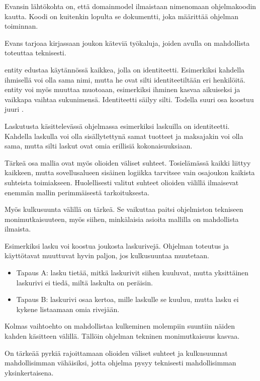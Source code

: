 Evansin lähtökohta on, että \gls{domainmodel} ilmaistaan nimenomaan
ohjelmakoodin kautta. Koodi on kuitenkin lopulta se dokumentti, joka
määrittää ohjelman toiminnan.

Evans tarjoaa kirjassaan joukon käteviä työkaluja, joiden avulla
 on mahdollista toteuttaa teknisesti.

\Gls{entity} edustaa käytännössä kaikkea, jolla on identiteetti.
Esimerkiksi kahdella ihmisellä voi olla sama nimi, mutta he ovat silti
identiteetiltään eri henkilöitä. \gls{entity} voi myös muuttaa muotoaan,
esimerkiksi ihminen kasvaa aikuiseksi ja vaikkapa vaihtaa sukunimensä.
Identiteetti säilyy silti. Todella suuri osa
 koostuu juuri
.

Laskutusta käsittelevässä ohjelmassa esimerkiksi laskuilla on
identiteetti. Kahdella laskulla voi olla sisällytettynä samat tuotteet
ja maksajakin voi olla sama, mutta silti laskut ovat omia erillisiä
kokonaisuuksiaan.

Tärkeä osa mallia ovat myös olioiden väliset suhteet. Tosielämässä
kaikki liittyy kaikkeen, mutta sovellusalueen sisäinen logiikka
tarvitsee vain osajoukon kaikista suhteista toimiakseen. Huolellisesti
valitut suhteet olioiden välillä ilmaisevat enemmän mallin perimmäisestä
tarkoituksesta.

Myös \gls{kulkusuunta}  välillä on tärkeä. Se
vaikuttaa paitsi ohjelmiston tekniseen monimutkaisuuteen, myös siihen,
minkälaisia asioita mallilla on mahdollista ilmaista.

Esimerkiksi lasku voi koostua joukosta laskurivejä. Ohjelman toteutus ja
käyttötavat muuttuvat hyvin paljon, jos kulkusuuntaa muutetaan.

\begin{itemize}
\tightlist
\item
  Tapaus A: lasku tietää, mitkä laskurivit siihen kuuluvat, mutta
  yksittäinen laskurivi ei tiedä, miltä laskulta on peräisin.
\item
  Tapaus B: laskurivi osaa kertoa, mille laskulle se kuuluu, mutta lasku
  ei kykene listaamaan omia rivejään.
\end{itemize}

Kolmas vaihtoehto on mahdollistaa kulkeminen molempiin suuntiin näiden
kahden käsitteen välillä. Tällöin ohjelman tekninen monimutkaisuus
kasvaa.

On tärkeää pyrkiä rajoittamaan olioiden väliset suhteet ja kulkusuunnat
mahdollisimman vähäisiksi, jotta ohjelma pysyy teknisesti mahdollisimman
yksinkertaisena.

